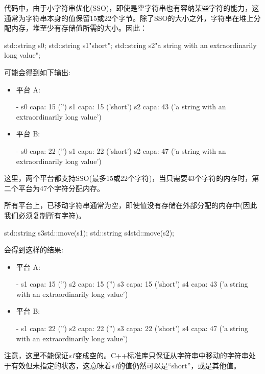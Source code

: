代码中，由于小字符串优化(SSO)，即使是空字符串也有容纳某些字符的能力，这通常为字符串本身的值保留15或22个字节。除了SSO的大小之外，字符串在堆上分配内存，堆至少有存储值所需的大小。因此：

\begin{cppcode}
std::string s0;
std::string s1{"short"};
std::string s2{"a string with an extraordinarily long value"};
\end{cppcode}

可能会得到如下输出:

\begin{itemize}
	\item 平台 A:
	\begin{outputcode}
- s0 capa: 15 ('')
s1 capa: 15 ('short')
s2 capa: 43 ('a string with an extraordinarily long value')
	\end{outputcode}
	\item 平台 B:
	\begin{outputcode}
- s0 capa: 22 ('')
s1 capa: 22 ('short')
s2 capa: 47 ('a string with an extraordinarily long value')
	\end{outputcode}
\end{itemize}

这里，两个平台都支持SSO(最多15或22个字符)，当只需要43个字符的内存时，第二个平台为47个字符分配内存。

所有平台上，已移动字符串通常为空，即使值没有存储在外部分配的内存中(因此我们必须复制所有字符)。

\begin{cppcode}
std::string s3{std::move(s1)};
std::string s4{std::move(s2)};
\end{cppcode}

会得到这样的结果:

\begin{itemize}
	\item 平台 A:
	\begin{outputcode}
- s1 capa: 15 ('')
s2 capa: 15 ('')
s3 capa: 15 ('short')
s4 capa: 43 ('a string with an extraordinarily long value')
	\end{outputcode}
	\item 平台 B:
	\begin{outputcode}
- s1 capa: 22 ('')
s2 capa: 22 ('')
s3 capa: 22 ('short')
s4 capa: 47 ('a string with an extraordinarily long value')
	\end{outputcode}
\end{itemize}

注意，这里不能保证\textit{s1}变成空的。C++标准库只保证从字符串中移动的字符串处于有效但未指定的状态，这意味着\textit{s1}的值仍然可以是“short”，或是其他值。

